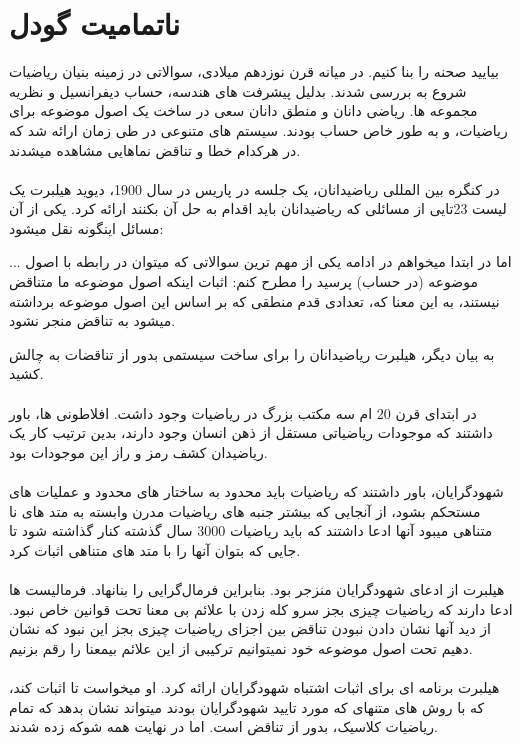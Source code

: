 \documentclass[9pt, twocolumn]{article}
\begin{document}
    \section{ناتمامیت گودل}
        بیایید صحنه را بنا کنیم. در میانه قرن نوزدهم میلادی، سوالاتی در زمینه بنیان ریاضیات شروع به بررسی شدند. بدلیل پیشرفت های هندسه، حساب دیفرانسیل و نظریه مجموعه ها. ریاضی دانان و منطق دانان سعی در ساخت یک اصول موضوعه برای ریاضیات، و به طور خاص حساب بودند. سیستم های متنوعی در طی زمان ارائه شد که در هرکدام خطا و تناقض نماهایی مشاهده میشدند.
        \\
        \\
        در کنگره بین المللی ریاضیدانان، یک جلسه در پاریس در سال 1900، دیوید هیلبرت یک لیست 23تایی از مسائلی که ریاضیدانان باید اقدام به حل آن بکنند ارائه کرد. یکی از آن مسائل اینگونه نقل میشود:
        \begin{qt}
        ... اما در ابتدا میخواهم در ادامه یکی از مهم ترین سوالاتی که میتوان در رابطه با اصول موضوعه (در حساب) پرسید را مطرح کنم: اثبات اینکه اصول موضوعه ما متناقض نیستند، به این معنا که، تعدادی قدم منطقی که بر اساس این اصول موضوعه برداشته میشود به تناقض منجر نشود.
        \end{qt} 
        به بیان دیگر، هیلبرت ریاضیدانان را برای ساخت سیستمی بدور از تناقضات به چالش کشید.
        \\
        \\
        در ابتدای قرن 20 ام سه مکتب بزرگ در ریاضیات وجود داشت. افلاطونی ها، باور داشتند که موجودات ریاضیاتی مستقل از ذهن انسان وجود دارند، بدین ترتیب کار یک ریاضیدان کشف رمز و راز این موجودات بود.
        \\
        \\
        شهودگرایان، باور داشتند که ریاضیات باید محدود به ساختار های محدود و عملیات های مستحکم بشود، از آنجایی که بیشتر جنبه های ریاضیات مدرن وابسته به متد های نا متناهی میبود آنها ادعا داشتند که باید ریاضیات 3000 سال گذشته کنار گذاشته شود تا جایی که بتوان آنها را با متد های متناهی اثبات کرد.
        \\
        \\
        هیلبرت از ادعای شهودگرایان منزجر بود. بنابراین فرمال‌گرایی را بنانهاد. فرمالیست ها ادعا دارند که ریاضیات چیزی بجز سرو کله زدن با علائم بی معنا تحت قوانین خاص نبود. از دید آنها نشان دادن نبودن تناقض بین اجزای ریاضیات چیزی بجز این نبود که نشان دهیم تحت اصول موضوعه خود نمیتوانیم ترکیبی از این علائم بیمعنا را رقم بزنیم.
        \\
        \\
        هیلبرت برنامه ای برای اثبات اشتباه شهودگرایان ارائه کرد. او میخواست تا اثبات کند، که با روش های متنهای که مورد تایید شهودگرایان بودند میتواند نشان بدهد که تمام ریاضیات کلاسیک، بدور از تناقض است. اما در نهایت همه شوکه زده شدند.
\end{document}
